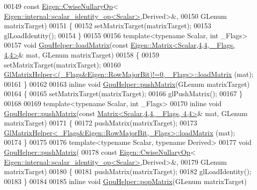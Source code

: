 \begin{DoxyCode}
00149     \textcolor{keyword}{const} \hyperlink{group___core___module_class_eigen_1_1_cwise_nullary_op}{Eigen::CwiseNullaryOp}<
      \hyperlink{struct_eigen_1_1internal_1_1scalar__identity__op}{Eigen::internal::scalar\_identity\_op<Scalar>},Derived>&,
00150     GLenum matrixTarget)
00151 \{
00152     setMatrixTarget(matrixTarget);
00153     glLoadIdentity();
00154 \}
00155 
00156 \textcolor{keyword}{template}<\textcolor{keyword}{typename} Scalar, \textcolor{keywordtype}{int} \_Flags>
00157 \textcolor{keywordtype}{void} \hyperlink{class_gpu_helper_a31ac77373dc54409648558d79d5a8c3e}{GpuHelper::loadMatrix}(\textcolor{keyword}{const} 
      \hyperlink{group___core___module_class_eigen_1_1_matrix}{Eigen::Matrix<Scalar,4,4, \_Flags, 4,4>}& mat, GLenum matrixTarget)
00158 \{
00159     setMatrixTarget(matrixTarget);
00160     \hyperlink{struct_gl_matrix_helper}{GlMatrixHelper<(\_Flags&Eigen::RowMajorBit)!=0, \_Flags>::loadMatrix}
      (mat);
00161 \}
00162 
00163 \textcolor{keyword}{inline} \textcolor{keywordtype}{void} \hyperlink{class_gpu_helper_ac51c8b669a80ca6e4338c87136fb991e}{GpuHelper::pushMatrix}(GLenum matrixTarget)
00164 \{
00165     setMatrixTarget(matrixTarget);
00166     glPushMatrix();
00167 \}
00168 
00169 \textcolor{keyword}{template}<\textcolor{keyword}{typename} Scalar, \textcolor{keywordtype}{int} \_Flags>
00170 \textcolor{keyword}{inline} \textcolor{keywordtype}{void} \hyperlink{class_gpu_helper_ac51c8b669a80ca6e4338c87136fb991e}{GpuHelper::pushMatrix}(\textcolor{keyword}{const} 
      \hyperlink{group___core___module_class_eigen_1_1_matrix}{Matrix<Scalar,4,4, \_Flags, 4,4>}& mat, GLenum matrixTarget)
00171 \{
00172     pushMatrix(matrixTarget);
00173     \hyperlink{struct_gl_matrix_helper}{GlMatrixHelper<\_Flags&Eigen::RowMajorBit,\_Flags>::loadMatrix}
      (mat);
00174 \}
00175 
00176 \textcolor{keyword}{template}<\textcolor{keyword}{typename} Scalar, \textcolor{keyword}{typename} Derived>
00177 \textcolor{keywordtype}{void} \hyperlink{class_gpu_helper_ac51c8b669a80ca6e4338c87136fb991e}{GpuHelper::pushMatrix}(
00178     \textcolor{keyword}{const} \hyperlink{group___core___module_class_eigen_1_1_cwise_nullary_op}{Eigen::CwiseNullaryOp}<
      \hyperlink{struct_eigen_1_1internal_1_1scalar__identity__op}{Eigen::internal::scalar\_identity\_op<Scalar>},Derived>&,
00179     GLenum matrixTarget)
00180 \{
00181     pushMatrix(matrixTarget);
00182     glLoadIdentity();
00183 \}
00184 
00185 \textcolor{keyword}{inline} \textcolor{keywordtype}{void} \hyperlink{class_gpu_helper_aad0cc23c2eaf0dcc610b180e5c8b195e}{GpuHelper::popMatrix}(GLenum matrixTarget)

\end{DoxyCode}
